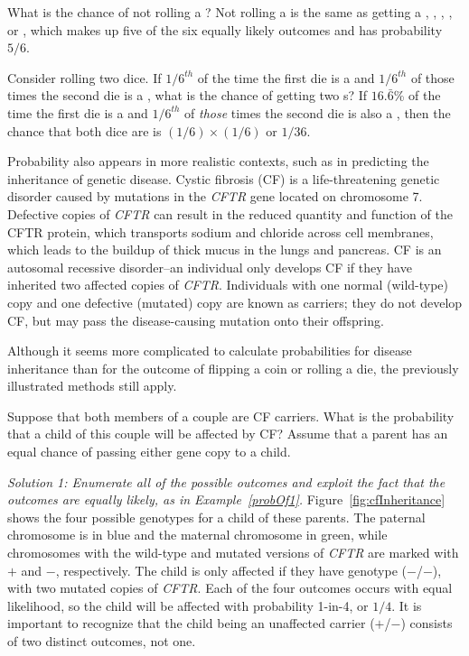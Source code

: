 \begin{doublespace}

\begin{example}{What is the chance of not rolling a ?}\label{probNot2}
Not rolling a  is the same as getting a , , , , or , which makes up five of the six equally likely outcomes and has probability $5/6$.
\end{example}

\begin{example} {Consider rolling two dice. If $1/6^{th}$ of the time the first die is a  and $1/6^{th}$ of those times the second die is a , what is the chance of getting two s?}\label{probOf2Ones}
If $16.\bar{6}$\% of the time the first die is a  and $1/6^{th}$ of \emph{those} times the second die is also a , then the chance that both dice are  is $(1/6)\times (1/6)$ or $1/36$.
\end{example}

Probability also appears in more realistic contexts, such as in predicting the inheritance of genetic disease. Cystic fibrosis (CF) is a life-threatening genetic disorder caused by mutations in the \textit{CFTR} gene located on chromosome 7. Defective copies of \textit{CFTR} can result in the reduced quantity and function of the CFTR protein, which transports sodium and chloride across cell membranes, which leads to the buildup of thick mucus in the lungs and pancreas. CF is an autosomal recessive disorder--an individual only develops CF if they have inherited two affected copies of \textit{CFTR}. Individuals with one normal (wild-type) copy and one defective (mutated) copy are known as carriers; they do not develop CF, but may pass the disease-causing mutation onto their offspring.

Although it seems more complicated to calculate probabilities for disease inheritance than for the outcome of flipping a coin or rolling a die, the previously illustrated methods still apply.

\begin{example} {Suppose that both members of a couple are CF carriers. What is the probability that a child of this couple will be affected by CF? Assume that a parent has an equal chance of passing either gene copy to a child.}\label{CFInheritanceExample}

\textit{Solution 1: Enumerate all of the possible outcomes and exploit the fact that the outcomes are equally likely, as in Example~\ref{probOf1}.}  Figure~\ref{fig:cfInheritance} shows the four possible genotypes for a child of these parents. The paternal chromosome is in blue and the maternal chromosome in green, while chromosomes with the wild-type and mutated versions of \textit{CFTR} are marked with $+$ and $-$, respectively. The child is only affected if they have genotype ($-$/$-$), with two mutated copies of \textit{CFTR}. Each of the four outcomes occurs with equal likelihood, so the child will be affected with probability 1-in-4, or $1/4$.  It is important to recognize that the child being an unaffected carrier ($+$/$-$) consists of two distinct outcomes, not one. 


\end{example}
\end{doublespace}
